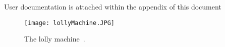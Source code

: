         User documentation is attached within the appendix of this document


    \begin{figure}[ht]
        \centering
        \texttt{[image: lollyMachine.JPG]}
        \caption{The lolly machine~\cite{thesisJodie}.}
        \label{fig:lollyMachine}
    \end{figure}

